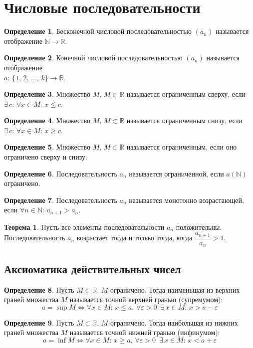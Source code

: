 \documentclass[12pt]{article}
\theoremstyle{definition}
\newtheorem{theorem}{Теорема}[section]
\newtheorem{definition}{Определение}
\newcommand{\N}{\mathbb{N}}
\newcommand{\R}{\mathbb{R}}
\begin{document}
\section{Числовые последовательности}
\begin{definition}
    Бесконечной числовой последовательностью $(a_n)$ называется отображение $\N \to \R$.
\end{definition}
\begin{definition}
    Конечной числовой последовательностью $(a_n)$ называется отображение\\ $a:\,\{1,\,2,\,\ldots,\,k\}\to \R$.
\end{definition}

\begin{definition}
    Множество $M,\,M\subset\R$ называется ограниченным сверху, если $\exists\, c:\,\forall x\in M:\,x \leq c$.
\end{definition}
\begin{definition}
    Множество $M,\,M\subset\R$ называется ограниченным снизу, если $\exists\, c:\,\forall x\in M:\,x \geq c$.
\end{definition}
\begin{definition}
    Множество $M,\,M\subset\R$ называется ограниченным, если оно ограничено сверху и снизу.
\end{definition}
\begin{definition}
    Последовательность $a_n$ называется ограниченной, если $a(\N)$ ограничено. 
\end{definition}
\begin{definition}
    Последовательность $a_n$ называется монотонно возрастающей, если $\forall n \in \N:\, a_{n+1}>a_n$.
\end{definition}
\begin{theorem}
    Пусть все элементы последовательности $a_n$ положительны. Последовательность $a_n$ возрастает тогда и только тогда, когда $\dfrac{a_{n+1}}{a_n}>1$.
\end{theorem}

\subsection{Аксиоматика действительных чисел}

\begin{definition}
    Пусть $M \subset \R,\,M$ ограничено. Тогда наименьшая из верхних граней множества $M$ называется точной верхней гранью (супремумом):
    $$a=\sup M\Longleftrightarrow \forall x \in M:\, x \leq a,\, \forall \varepsilon>0\,\,\, \exists\, x \in M:\, x>a-\varepsilon$$
\end{definition}
\begin{definition}
    Пусть $M \subset \R,\,M$ ограничено. Тогда наибольшая из нижних граней множества $M$ называется точной нижней гранью (инфинумом):
    $$a=\inf M\Longleftrightarrow \forall x \in M:\, x \geq a,\, \forall \varepsilon>0\,\,\, \exists\, x \in M:\, x<a+\varepsilon$$
\end{definition}
\end{document}
